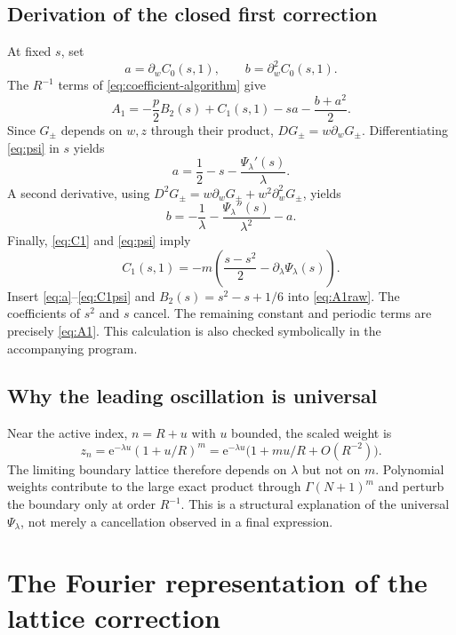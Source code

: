 \documentclass[11pt,a4paper]{article}
\numberwithin{equation}{section}
\theoremstyle{definition}
\newcommand{\ee}{\mathrm e}
\begin{document}
\subsection{Derivation of the closed first correction}
At fixed $s$, set
\begin{equation}
 a=\partial_w C_0(s,1),\qquad b=\partial_w^2 C_0(s,1).
 \label{eq:ab}
\end{equation}
The $R^{-1}$ terms of \eqref{eq:coefficient-algorithm} give
\begin{equation}
 A_1=-\frac p2B_2(s)+C_1(s,1)-sa-\frac{b+a^2}{2}.
 \label{eq:A1raw}
\end{equation}
Since $G_\pm$ depends on $w,z$ through their product,
$D G_\pm=w\partial_wG_\pm$. Differentiating \eqref{eq:psi} in $s$ yields
\begin{equation}
 a=\frac12-s-\frac{\Psi_\lambda'(s)}\lambda.
 \label{eq:a}
\end{equation}
A second derivative, using $D^2G_\pm=w\partial_wG_\pm+w^2\partial_w^2G_\pm$, yields
\begin{equation}
 b=-\frac1\lambda-\frac{\Psi_\lambda''(s)}{\lambda^2}-a.
 \label{eq:b}
\end{equation}
Finally, \eqref{eq:C1} and \eqref{eq:psi} imply
\begin{equation}
 C_1(s,1)=-m\left(\frac{s-s^2}{2}-\partial_\lambda\Psi_\lambda(s)\right).
 \label{eq:C1psi}
\end{equation}
Insert \eqref{eq:a}--\eqref{eq:C1psi} and $B_2(s)=s^2-s+1/6$ into \eqref{eq:A1raw}. The coefficients of $s^2$ and $s$ cancel. The remaining constant and periodic terms are precisely \eqref{eq:A1}. This calculation is also checked symbolically in the accompanying program.

\subsection{Why the leading oscillation is universal}
Near the active index, $n=R+u$ with $u$ bounded, the scaled weight is
\[
 z_n=\ee^{-\lambda u}(1+u/R)^m
     =\ee^{-\lambda u}\bigl(1+mu/R+O(R^{-2})\bigr).
\]
The limiting boundary lattice therefore depends on $\lambda$ but not on $m$. Polynomial weights contribute to the large exact product through $\Gamma(N+1)^m$ and perturb the boundary only at order $R^{-1}$. This is a structural explanation of the universal $\Psi_\lambda$, not merely a cancellation observed in a final expression.

\section{The Fourier representation of the lattice correction}
\label{sec:fourier-proof}
\end{document}
